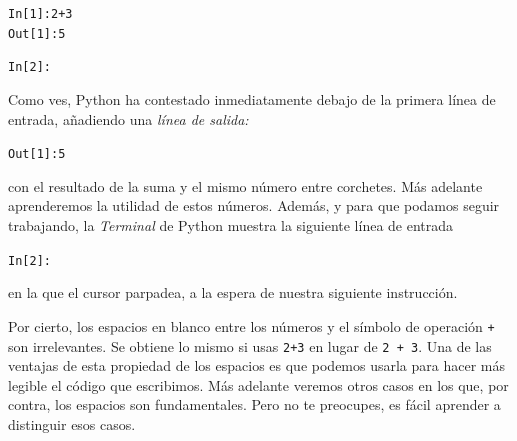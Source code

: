 \documentclass[10pt,a4paper]{article}\usepackage[]{graphicx}\usepackage[]{color}
\makeatletter
\newcommand{\hlnum}[1]{\textcolor[rgb]{0.686,0.059,0.569}{#1}}%
\newcommand{\hlopt}[1]{\textcolor[rgb]{0,0,0}{#1}}%
\newcommand{\hlstd}[1]{\textcolor[rgb]{0.345,0.345,0.345}{#1}}%
\newenvironment{kframe}{%
 \def\at@end@of@kframe{}%
 \ifinner\ifhmode%
  \def\at@end@of@kframe{\end{minipage}}%
  \begin{minipage}{\columnwidth}%
 \fi\fi%
 \def\FrameCommand##1{\hskip\@totalleftmargin \hskip-\fboxsep
 \colorbox{shadecolor}{##1}\hskip-\fboxsep
     \hskip-\linewidth \hskip-\@totalleftmargin \hskip\columnwidth}%
 \MakeFramed {\advance\hsize-\width
   \@totalleftmargin\z@ \linewidth\hsize
   \@setminipage}}%
 {\par\unskip\endMakeFramed%
 \at@end@of@kframe}
\newenvironment{knitrout}{}{} %
\newcounter {cont01}
\makeatother
\begin{document}
\begin{knitrout}
\color{fgcolor}\begin{kframe}
\begin{alltt}
In [1]: 2 + 3
Out[1]: 5

In [2]:
\end{alltt}
\end{kframe}
\end{knitrout}
Como ves, Python ha contestado inmediatamente debajo de la primera línea de entrada, añadiendo una {\em línea de salida:}
\begin{knitrout}
\color{fgcolor}\begin{kframe}
\begin{alltt}
\hlstd{Out[}\hlnum{1}\hlstd{]}\hlopt{:} \hlnum{5}
\end{alltt}
\end{kframe}
\end{knitrout}
con el resultado de la suma y el mismo número entre corchetes. Más adelante aprenderemos la utilidad de estos números. Además, y para que podamos seguir trabajando, la {\em Terminal} de Python muestra la siguiente línea de entrada 
\begin{knitrout}
\color{fgcolor}\begin{kframe}
\begin{alltt}
In [2]:  
\end{alltt}
\end{kframe}
\end{knitrout}
en la que el cursor parpadea, a la espera de nuestra siguiente instrucción.

Por cierto, los espacios en blanco entre los números y el símbolo de operación {\tt +} son irrelevantes. Se obtiene lo mismo si usas {\tt 2+3} en lugar de {\tt 2 + 3}.  Una de las ventajas de  esta propiedad de los espacios es que podemos usarla para hacer más legible el código que escribimos. Más adelante veremos otros casos en  los que, por contra, los espacios son fundamentales. Pero no te preocupes, es fácil aprender a distinguir esos casos.
\end{document}
